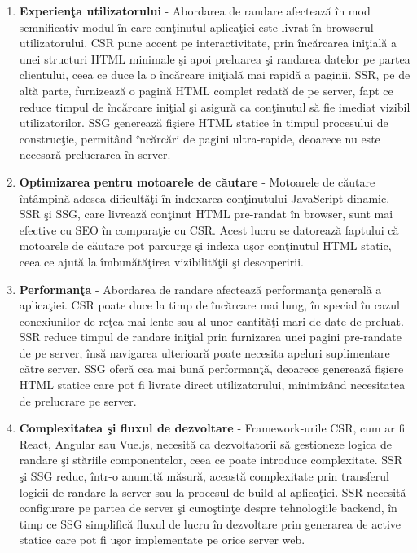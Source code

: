 \documentclass[12pt, a4paper]{report}
\begin{document}
\begin{enumerate}
	\item \textbf{Experien\c ta utilizatorului} - Abordarea de randare afecteaz\u a \^in mod semnificativ modul \^in care con\c tinutul aplica\c tiei este livrat \^in browserul utilizatorului. CSR pune accent pe interactivitate, prin \^inc\u arcarea ini\c tial\u a a unei structuri HTML minimale \c si apoi preluarea \c si randarea datelor pe partea clientului, ceea ce duce la o \^inc\u arcare ini\c tial\u a mai rapid\u a a paginii. SSR, pe de alt\u a parte, furnizeaz\u a o pagin\u a HTML complet redat\u a de pe server, fapt ce reduce timpul de \^inc\u arcare ini\c tial \c si asigur\u a ca con\c tinutul s\u a fie imediat vizibil utilizatorilor. SSG genereaz\u a fi\c siere HTML statice \^in timpul procesului de construc\c tie, permit\^and \^inc\u arc\u ari de pagini ultra-rapide, deoarece nu este necesar\u a prelucrarea \^in server.
	\item \textbf{Optimizarea pentru motoarele de c\u autare} - Motoarele de c\u autare \^int\^ampin\u a adesea dificult\u a\c ti \^in indexarea con\c tinutului JavaScript dinamic. SSR \c si SSG, care livreaz\u a con\c tinut HTML pre-randat \^in browser, sunt mai efective cu SEO \^in compara\c tie cu CSR. Acest lucru se datoreaz\u a faptului c\u a motoarele de c\u autare pot parcurge \c si indexa u\c sor con\c tinutul HTML static, ceea ce ajut\u a la \^imbun\u at\u a\c tirea vizibilit\u a\c tii \c si descoperirii.
	\item \textbf{Performan\c ta} - Abordarea de randare afecteaz\u a performan\c ta general\u a a aplica\c tiei. CSR poate duce la timp de \^inc\u arcare mai lung, \^in special \^in cazul conexiunilor de re\c tea mai lente sau al unor cantit\u a\c ti mari de date de preluat. SSR reduce timpul de randare ini\c tial prin furnizarea unei pagini pre-randate de pe server, \^ins\u a navigarea ulterioar\u a poate necesita apeluri suplimentare c\u atre server. SSG ofer\u a cea mai bun\u a performan\c t\u a, deoarece genereaz\u a fi\c siere HTML statice care pot fi livrate direct utilizatorului, minimiz\^and necesitatea de prelucrare pe server.
	\item \textbf{Complexitatea \c si fluxul de dezvoltare} - Framework-urile CSR, cum ar fi React, Angular sau Vue.js, necesit\u a ca dezvoltatorii s\u a gestioneze logica de randare \c si st\u ariile componentelor, ceea ce poate introduce complexitate. SSR \c si SSG reduc, \^intr-o anumit\u a m\u asur\u a, aceast\u a complexitate prin transferul logicii de randare la server sau la procesul de build al aplica\c tiei. SSR necesit\u a configurare pe partea de server \c si cuno\c stin\c te despre tehnologiile backend, \^in timp ce SSG simplific\u a fluxul de lucru \^in dezvoltare prin generarea de active statice care pot fi u\c sor implementate pe orice server web.

\end{enumerate}
\end{document}
